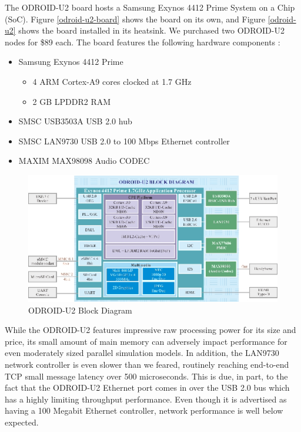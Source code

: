 \documentclass[11pt]{book}
\begin{document}
The ODROID-U2 board hosts a Samsung Exynos 4412 Prime System on a Chip (SoC).  Figure
\ref{odroid-u2-board} shows the board on its own, and Figure \ref{odroid-u2} shows the
board installed in its heatsink.  We purchased two ODROID-U2 nodes for \$89 each.  The
board features the following hardware components \cite{odroid-u2-board-detail}:

\begin{itemize}
\item Samsung Exynos 4412 Prime
  \begin{itemize}
  \item 4 ARM Cortex-A9 cores clocked at 1.7 GHz
  \item 2 GB LPDDR2 RAM
  \end{itemize}
\item SMSC USB3503A USB 2.0 hub
\item SMSC LAN9730 USB 2.0 to 100 Mbps Ethernet controller
\item MAXIM MAX98098 Audio CODEC
\end{itemize}

\begin{figure}
\centering
\includegraphics[width=\textwidth]{odroid_u2_block_diagram}
\caption{ODROID-U2 Block Diagram \cite{odroid-u2-board-detail}}
\label{odroid-u2-block-diagram}
\end{figure}

While the ODROID-U2 features impressive raw processing power for its size and price, its
small amount of main memory can adversely impact performance for even moderately sized
parallel simulation models.  In addition, the LAN9730 network controller is even slower
than we feared, routinely reaching end-to-end TCP small message latency over 500
microseconds.  This is due, in part, to the fact that the ODROID-U2 Ethernet port comes in
over the USB 2.0 bus which has a highly limiting throughput performance.  Even though it
is advertised as having a 100 Megabit Ethernet controller, network performance is well below
expected.
\end{document}
